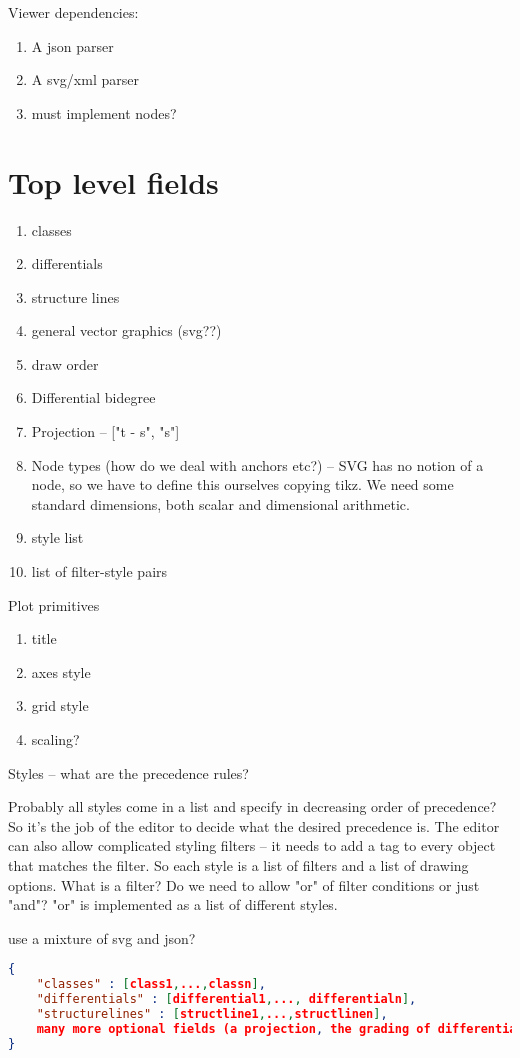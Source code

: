 \documentclass{article}
\begin{document}
Viewer dependencies:
\begin{enumerate}
\item A json parser
\item A svg/xml parser
\item must implement nodes?
\end{enumerate}


\section{Top level fields}
\begin{enumerate}
\item classes
\item differentials
\item structure lines
\item general vector graphics (svg??)
\item draw order
\item Differential bidegree
\item Projection -- ["t - s", "s"]
\item Node types (how do we deal with anchors etc?) -- SVG has no notion of a node, so we have to define this ourselves copying tikz. We need some standard dimensions, both scalar and dimensional arithmetic.
\item style list
\item list of filter-style pairs
\end{enumerate}




Plot primitives
\begin{enumerate}
\item title
\item axes style
\item grid style
\item scaling?
\end{enumerate}

Styles -- what are the precedence rules?

Probably all styles come in a list and specify in decreasing order of precedence? So it's the job of the editor to decide what the desired precedence is.
The editor can also allow complicated styling filters -- it needs to add a tag to every object that matches the filter.
So each style is a list of filters and a list of drawing options. What is a filter? Do we need to allow "or" of filter conditions or just "and"? "or" is implemented as a list of different styles.

use a mixture of svg and json?



\begin{lstlisting}[language=json]
{
    "classes" : [class1,...,classn],
    "differentials" : [differential1,..., differentialn],
    "structurelines" : [structline1,...,structlinen],
    many more optional fields (a projection, the grading of differentials, axes labels, grid, arbitrary annotations etc etc etc)
}
\end{lstlisting}
\end{document}
